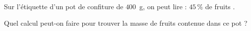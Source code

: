 
Sur l'étiquette d'un pot de confiture de $400$~g, on peut lire : \og $45\,\%$ de fruits \fg.

Quel calcul peut-on faire pour trouver la masse de fruits contenue dans ce pot ?

\smallskip
{}
